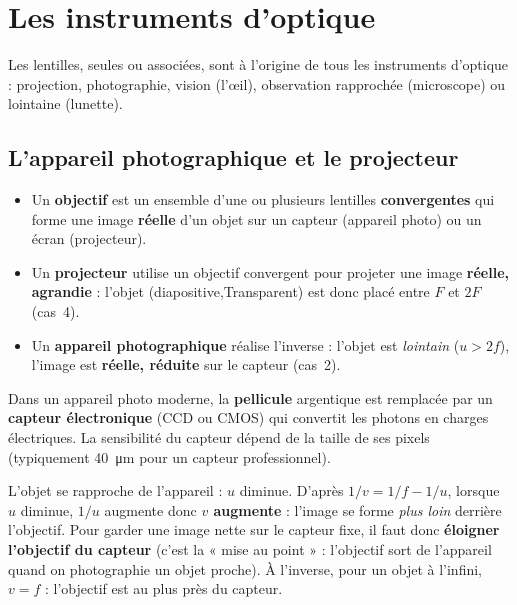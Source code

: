 \documentclass[11pt,a4paper]{article}
\begin{document}
\section{Les instruments d'optique}
Les lentilles, seules ou associées, sont à l'origine de tous les instruments d'optique : projection,
photographie, vision (l'œil), observation rapprochée (microscope) ou lointaine (lunette).

\subsection{L'appareil photographique et le projecteur}

\begin{definition}
\hfill
\begin{itemize}[leftmargin=1.7em,topsep=2pt,itemsep=2pt]
  \item Un \textbf{objectif} est un ensemble d'une ou plusieurs lentilles \textbf{convergentes} qui
        forme une image \textbf{réelle} d'un objet sur un capteur (appareil photo) ou un écran
        (projecteur).
  \item Un \textbf{projecteur} utilise un objectif convergent pour projeter une image \textbf{réelle,
        agrandie} : l'objet (diapositive,Transparent) est donc placé entre $F$ et $2F$ (cas~4).
  \item Un \textbf{appareil photographique} réalise l'inverse : l'objet est \emph{lointain} ($u>2f$),
        l'image est \textbf{réelle, réduite} sur le capteur (cas~2).
\end{itemize}
\end{definition}

Dans un appareil photo moderne, la \textbf{pellicule} argentique est remplacée par un \textbf{capteur
électronique} (CCD ou CMOS) qui convertit les photons en charges électriques. La sensibilité du
capteur dépend de la taille de ses pixels (typiquement \SI{40}{\micro\metre} pour un capteur
professionnel).

\begin{exemple}
L'objet se rapproche de l'appareil : $u$ diminue. D'après $1/v=1/f-1/u$, lorsque $u$ diminue, $1/u$
augmente donc \textbf{$v$ augmente} : l'image se forme \emph{plus loin} derrière l'objectif. Pour
garder une image nette sur le capteur fixe, il faut donc \textbf{éloigner l'objectif du capteur}
(c'est la « mise au point » : l'objectif sort de l'appareil quand on photographie un objet proche).
À l'inverse, pour un objet à l'infini, $v=f$ : l'objectif est au plus près du capteur.
\end{exemple}
\end{document}

